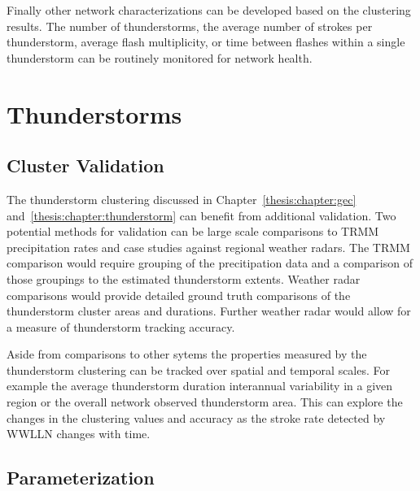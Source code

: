 Finally other network characterizations can be developed based on the clustering results.
The number of thunderstorms, the average number of strokes per thunderstorm, average flash multiplicity, or time between flashes within a single thunderstorm can be routinely monitored for network health.

\section{Thunderstorms}

\subsection{Cluster Validation}

The thunderstorm clustering discussed in Chapter~\ref{thesis:chapter:gec} and~\ref{thesis:chapter:thunderstorm} can benefit from additional validation.
Two potential methods for validation can be large scale comparisons to TRMM precipitation rates and case studies against regional weather radars.
The TRMM comparison would require grouping of the precitipation data and a comparison of those groupings to the estimated thunderstorm extents.
Weather radar comparisons would provide detailed ground truth comparisons of the thunderstorm cluster areas and durations.
Further weather radar would allow for a measure of thunderstorm tracking accuracy.

Aside from comparisons to other sytems the properties measured by the thunderstorm clustering can be tracked over spatial and temporal scales.
For example the average thunderstorm duration interannual variability in a given region or the overall network observed thunderstorm area.
This can explore the changes in the clustering values and accuracy as the stroke rate detected by WWLLN changes with time.

\subsection{Parameterization}

